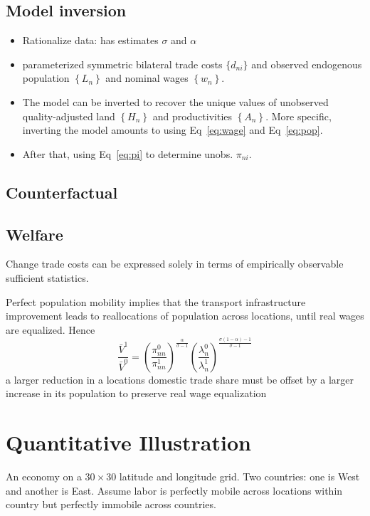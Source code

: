\documentclass[11pt,a4paper]{article}
\begin{document}
\subsection{Model inversion}
\begin{itemize}
  \item Rationalize data: has estimates $\sigma $ and $\alpha $
  \item parameterized symmetric bilateral trade costs $\{d_{ni}\}$ and observed endogenous population $\left\{ L_n \right\}$ and nominal wages $\left\{ w_n \right\}$.
  \item The model can be inverted to recover the unique values of unobserved quality-adjusted land $\left\{ H_n \right\}$ and productivities $\left\{ A_n \right\}$. More specific, inverting the model amounts to using Eq~\eqref{eq:wage} and Eq~\eqref{eq:pop}. 
  \item After that, using Eq~\eqref{eq:pi} to determine unobs. $\pi _{ni}$.
\end{itemize}


\subsection{Counterfactual}


\subsection{Welfare}
Change trade costs can be expressed solely in terms of empirically observable sufficient statistics. 

Perfect population mobility implies that the transport infrastructure improvement leads to reallocations of population across locations, until real wages are equalized. Hence \begin{equation}
  \frac{\bar{V}^1 }{\bar{V}^0} = \left( \frac{\pi _{nn}^0}{\pi _{nn}^1} \right)^{\frac{\alpha }{\sigma -1}} \left( \frac{\lambda _n^0}{\lambda _n^1} \right)^{\frac{\sigma (1-\alpha ) - 1}{\sigma -1}}
\end{equation}
a larger reduction in a locations domestic trade share must be offset by a larger increase in its population to preserve real wage equalization


\section{Quantitative Illustration}
An economy on a $30 \times 30$ latitude and longitude grid. 
Two countries: one is West and another is East. 
Assume labor is perfectly mobile across locations within country but perfectly immobile across countries. 
\end{document}
